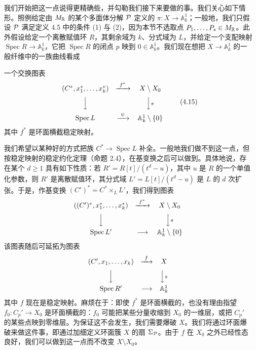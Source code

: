 我们开始把这一点说得更精确些，并勾勒我们接下来要做的事。我们关心如下情形。照例给定由 $M_{\mathbb{R}}$ 的某个多面体分解 $\mathcal{P}$ 定义的 $\pi:X\to\mathbb{A}^1_k$；一般地，我们只假设 $\mathcal{P}$ 满足定义 4.5 中的条件 (1) 与 (2)，因为本节不选取点 $P_1,\dots,P_s\in M_{\mathbb{R}}$。此外假设给定一个离散赋值环 $R$，其剩余域为 $k$、分式域为 $L$，并给定一个支配映射 $\operatorname{Spec} R\to\mathbb{A}^1_k$，它把 $\operatorname{Spec} R$ 的闭点 $p$ 映到 $0\in\mathbb{A}^1_k$。我们现在想把 $X\to\mathbb{A}^1_k$ 的一般纤维中的一族曲线看成

一个交换图表
\begin{equation}
\begin{array}{ccc}
(C^*,x_1^*,\dots,x_k^*) & \xrightarrow{\ f^*\ } & X\setminus X_0\\[6pt]
\Big\downarrow & & \Big\downarrow{\scriptstyle\pi}\\[6pt]
\operatorname{Spec} L & \xrightarrow{\ \psi\ } & \mathbb{A}^1_k\setminus\{0\}
\end{array}
\tag{4.15}
\end{equation}
其中 $f^*$ 是环面横截稳定映射。

我们希望以某种好的方式把族 $C^*\to\operatorname{Spec} L$ 补全。一般地我们做不到这一点，但按稳定映射的稳定约化定理（命题 2.4），在基变换之后可以做到。具体地说，存在某个 $d\ge1$ 具有如下性质：若 $R'=R[t]/(t^d-u)$，其中 $u$ 是 $R$ 的一个单值化参数，则 $R'$ 是离散赋值环，其分式域 $L'=L[t]/(t^d-u)$ 是 $L$ 的 $d$ 次扩张。于是，作基变换 $(C')^*=C^*\times_LL'$，我们得到图表
\begin{equation*}
\begin{array}{ccc}
((C')^*,x_1^*,\dots,x_k^*) & \xrightarrow{\ f^*\ } & X\setminus X_0\\[6pt]
\Big\downarrow & & \Big\downarrow{\scriptstyle\pi}\\[6pt]
\operatorname{Spec} L' & \longrightarrow & \mathbb{A}^1_k\setminus\{0\}
\end{array}
\end{equation*}
该图表随后可延拓为图表
\begin{equation*}
\begin{array}{ccc}
(C',x_1,\dots,x_k) & \xrightarrow{\ f\ } & X\\[6pt]
\Big\downarrow & & \Big\downarrow{\scriptstyle\pi}\\[6pt]
\operatorname{Spec} R' & \longrightarrow & \mathbb{A}^1_k
\end{array}
\end{equation*}
其中 $f$ 现在是稳定映射。麻烦在于：即使 $f^*$ 是环面横截的，也没有理由指望 $f_0:C_p'\to X_0$ 是环面横截的：$f_0$ 可能把某些分量收缩到 $X_0$ 的一维层，或把 $C_p'$ 的某些点映到零维层。为保证这不会发生，我们需要爆破 $X$。我们将通过环面爆破来做这件事，即通过加细定义环面簇 $X$ 的扇 $\Sigma_{\mathcal{P}}$。由于 $f$ 在 $X_0$ 之外已经性态良好，我们可以做到这一点而不改变 $X\setminus X_0$。

